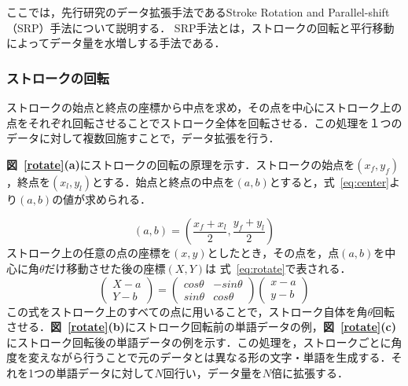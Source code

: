 ここでは，先行研究\cite{takahashi}のデータ拡張手法であるStroke Rotation and Parallel-shift（SRP）手法について説明する．
SRP手法とは，ストロークの回転と平行移動によってデータ量を水増しする手法である．
\subsubsection{ストロークの回転}
ストロークの始点と終点の座標から中点を求め，その点を中心にストローク上の点をそれぞれ回転させることでストローク全体を回転させる．この処理を１つのデータに対して複数回施すことで，データ拡張を行う．

\textbf{図~\ref{rotate}(a)}にストロークの回転の原理を示す．ストロークの始点を$(x_f, y_f)$，終点を$(x_l, y_l)$とする．始点と終点の中点を$(a, b)$とすると，式~\ref{eq:center}より$(a, b)$の値が求められる．

\begin{equation}
  (a, b) = (\frac{x_f+x_l}{2}, \frac{y_f+y_l}{2})
  \label{eq:center}
\end{equation}
ストローク上の任意の点の座標を$(x, y)$としたとき，その点を，点$(a, b)$を中心に角$\theta$だけ移動させた後の座標$(X, Y)$は 式~\ref{eq:rotate}で表される．
\begin{equation}
  \left(
    \begin{array}{r}
        X-a \\
        Y-b
    \end{array}
    \right)
 = \left(
  \begin{array}{rr}
      cos\theta & -sin\theta \\
      sin\theta & cos\theta
  \end{array}
  \right)
  \left(
    \begin{array}{r}
        x-a \\
        y-b
    \end{array}
    \right)
  \label{eq:rotate}
\end{equation}
この式をストローク上のすべての点に用いることで，ストローク自体を角$\theta$回転させる．\textbf{図~\ref{rotate}(b)}にストローク回転前の単語データの例，\textbf{図~\ref{rotate}(c)}にストローク回転後の単語データの例を示す．この処理を，ストロークごとに角度を変えながら行うことで元のデータとは異なる形の文字・単語を生成する．それを1つの単語データに対して$N$回行い，データ量を$N$倍に拡張する．

